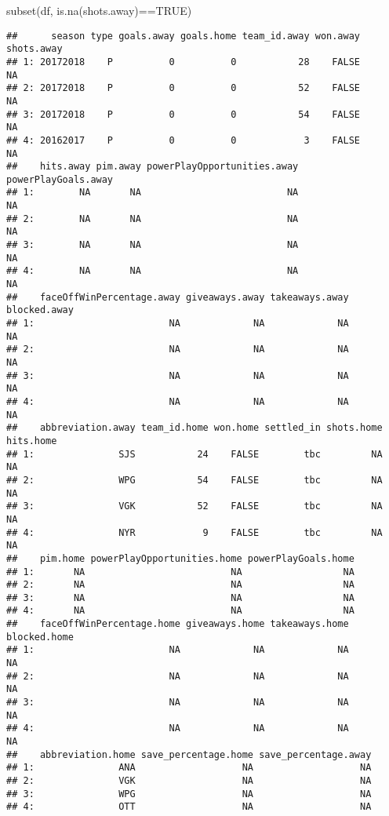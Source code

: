 \documentclass[
]{article}
\newenvironment{Shaded}{\begin{snugshade}}{\end{snugshade}}
\newcommand{\ConstantTok}[1]{\textcolor[rgb]{0.00,0.00,0.00}{#1}}
\newcommand{\FunctionTok}[1]{\textcolor[rgb]{0.00,0.00,0.00}{#1}}
\newcommand{\NormalTok}[1]{#1}
\newcommand{\SpecialCharTok}[1]{\textcolor[rgb]{0.00,0.00,0.00}{#1}}
\begin{document}
\begin{Shaded}
\begin{Highlighting}[]
\FunctionTok{subset}\NormalTok{(df, }\FunctionTok{is.na}\NormalTok{(shots.away)}\SpecialCharTok{==}\ConstantTok{TRUE}\NormalTok{)}
\end{Highlighting}
\end{Shaded}

\begin{verbatim}
##      season type goals.away goals.home team_id.away won.away shots.away
## 1: 20172018    P          0          0           28    FALSE         NA
## 2: 20172018    P          0          0           52    FALSE         NA
## 3: 20172018    P          0          0           54    FALSE         NA
## 4: 20162017    P          0          0            3    FALSE         NA
##    hits.away pim.away powerPlayOpportunities.away powerPlayGoals.away
## 1:        NA       NA                          NA                  NA
## 2:        NA       NA                          NA                  NA
## 3:        NA       NA                          NA                  NA
## 4:        NA       NA                          NA                  NA
##    faceOffWinPercentage.away giveaways.away takeaways.away blocked.away
## 1:                        NA             NA             NA           NA
## 2:                        NA             NA             NA           NA
## 3:                        NA             NA             NA           NA
## 4:                        NA             NA             NA           NA
##    abbreviation.away team_id.home won.home settled_in shots.home hits.home
## 1:               SJS           24    FALSE        tbc         NA        NA
## 2:               WPG           54    FALSE        tbc         NA        NA
## 3:               VGK           52    FALSE        tbc         NA        NA
## 4:               NYR            9    FALSE        tbc         NA        NA
##    pim.home powerPlayOpportunities.home powerPlayGoals.home
## 1:       NA                          NA                  NA
## 2:       NA                          NA                  NA
## 3:       NA                          NA                  NA
## 4:       NA                          NA                  NA
##    faceOffWinPercentage.home giveaways.home takeaways.home blocked.home
## 1:                        NA             NA             NA           NA
## 2:                        NA             NA             NA           NA
## 3:                        NA             NA             NA           NA
## 4:                        NA             NA             NA           NA
##    abbreviation.home save_percentage.home save_percentage.away
## 1:               ANA                   NA                   NA
## 2:               VGK                   NA                   NA
## 3:               WPG                   NA                   NA
## 4:               OTT                   NA                   NA
\end{verbatim}
\end{document}
